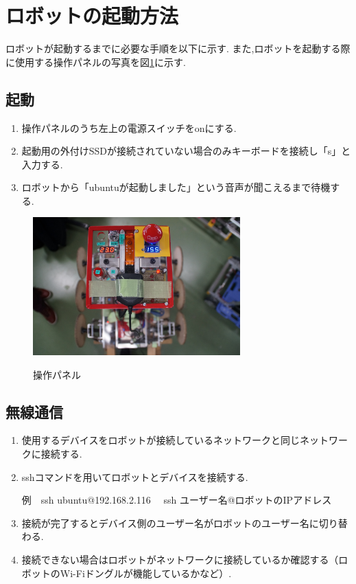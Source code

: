 \section{ロボットの起動方法}
ロボットが起動するまでに必要な手順を以下に示す.
また,ロボットを起動する際に使用する操作パネルの写真を図\ref{fig:start_panel}に示す.
\subsection{起動}
\begin{enumerate}
\item 操作パネルのうち左上の電源スイッチをonにする.
\item 起動用の外付けSSDが接続されていない場合のみキーボードを接続し「s」と入力する.
\item ロボットから「ubuntuが起動しました」という音声が聞こえるまで待機する.
\end{enumerate}

\begin{figure}[htp]
 \begin{center}
  \includegraphics[width=80mm]{img/soft/DSC07946.jpg}
 　\caption{操作パネル}
  \label{fig:start_panel}%
 \end{center}
\end{figure}

\subsection{無線通信}
\begin{enumerate}
\item 使用するデバイスをロボットが接続しているネットワークと同じネットワークに接続する.
\item sshコマンドを用いてロボットとデバイスを接続する.

例　ssh ubuntu@192.168.2.116　 ssh ユーザー名@ロボットのIPアドレス   
\item 接続が完了するとデバイス側のユーザー名がロボットのユーザー名に切り替わる.
\item 接続できない場合はロボットがネットワークに接続しているか確認する（ロボットのWi-Fiドングルが機能しているかなど）.  
\end{enumerate}

